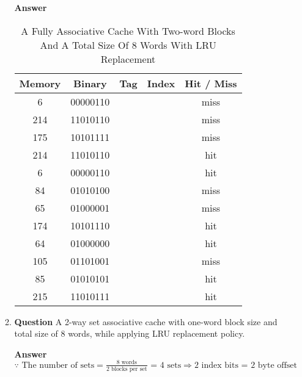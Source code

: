 \documentclass[10pt]{extarticle}
\begin{document}
\begin{enumerate}
\begin{enumerate}
            \textbf{Answer}
            \begin{table}[h]
                \centering
                \caption{A Fully Associative Cache With Two-word Blocks And A
                Total Size Of 8 Words With LRU Replacement}
                \begin{tabular*}{300pt}{@{\extracolsep{\fill}} ccccc}
                    \textbf{Memory} & \textbf{Binary} & \textbf{Tag} &
                    \textbf{Index} & \textbf{Hit / Miss} \\
                    \hline
                    6   & 00000110 & & & miss   \\
                    214 & 11010110 & & & miss   \\
                    175 & 10101111 & & & miss   \\
                    214 & 11010110 & & & hit    \\
                    6   & 00000110 & & & hit    \\
                    84  & 01010100 & & & miss   \\
                    65  & 01000001 & & & miss   \\
                    174 & 10101110 & & & hit    \\
                    64  & 01000000 & & & hit    \\
                    105 & 01101001 & & & miss   \\
                    85  & 01010101 & & & hit    \\
                    215 & 11010111 & & & hit    \\
                \end{tabular*}
            \end{table}
            \newpage

            \item \textbf{Question} A 2-way set associative cache with one-word
            block size and total size of 8 words, while applying LRU
            replacement policy.

            \textbf{Answer} \\ $\because \text{ The number of sets} =
            \frac{\text{8 words}}{\text{2 blocks per set}} \text{ = 4 sets} \Rightarrow \text{2 index bits = 2 byte offset}$


\end{enumerate}
\end{enumerate}
\end{document}
